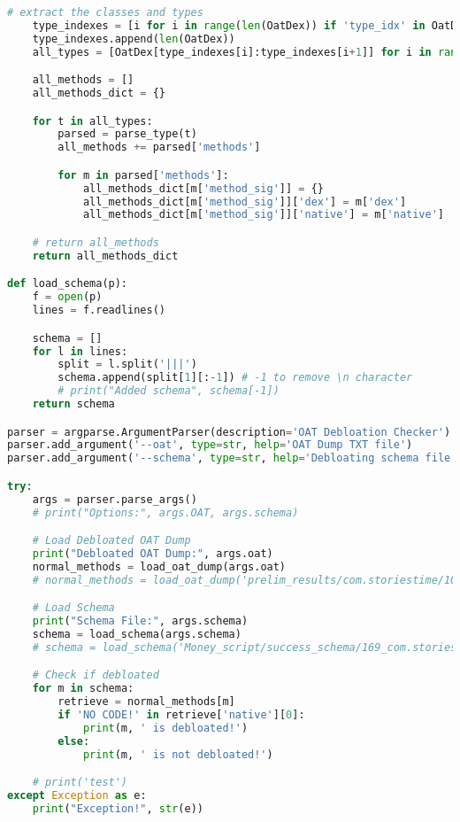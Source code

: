 \begin{lstlisting}[language=python]
    # extract the classes and types
    type_indexes = [i for i in range(len(OatDex)) if 'type_idx' in OatDex[i]]
    type_indexes.append(len(OatDex))
    all_types = [OatDex[type_indexes[i]:type_indexes[i+1]] for i in range(0, len(type_indexes)-1)]

    all_methods = []
    all_methods_dict = {}

    for t in all_types:
        parsed = parse_type(t) 
        all_methods += parsed['methods']

        for m in parsed['methods']:
            all_methods_dict[m['method_sig']] = {}
            all_methods_dict[m['method_sig']]['dex'] = m['dex']
            all_methods_dict[m['method_sig']]['native'] = m['native']

    # return all_methods
    return all_methods_dict

def load_schema(p):
    f = open(p)
    lines = f.readlines()

    schema = []
    for l in lines:
        split = l.split('|||')
        schema.append(split[1][:-1]) # -1 to remove \n character
        # print("Added schema", schema[-1])
    return schema

parser = argparse.ArgumentParser(description='OAT Debloation Checker')
parser.add_argument('--oat', type=str, help='OAT Dump TXT file')
parser.add_argument('--schema', type=str, help='Debloating schema file')

try:
    args = parser.parse_args()
    # print("Options:", args.OAT, args.schema)

    # Load Debloated OAT Dump
    print("Debloated OAT Dump:", args.oat)
    normal_methods = load_oat_dump(args.oat)
    # normal_methods = load_oat_dump('prelim_results/com.storiestime/10min_normal_com.storiestime_oat_dump.txt')

    # Load Schema
    print("Schema File:", args.schema)
    schema = load_schema(args.schema)
    # schema = load_schema('Money_script/success_schema/169_com.storiestime_removed_methods.txt')

    # Check if debloated
    for m in schema:
        retrieve = normal_methods[m]
        if 'NO CODE!' in retrieve['native'][0]:
            print(m, ' is debloated!')
        else:
            print(m, ' is not debloated!')

    # print('test')    
except Exception as e:
    print("Exception!", str(e))
\end{lstlisting}


